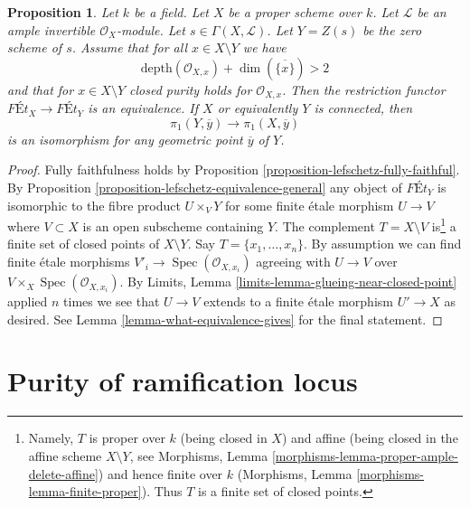 \documentclass{stacks-project}
\theoremstyle{plain}
\newtheorem{proposition}[subsection]{Proposition}
\theoremstyle{definition}
\theoremstyle{remark}
\numberwithin{equation}{subsection}
\def\Spec{\mathop{\mathrm{Spec}}}
\begin{document}
\begin{proposition}
\label{proposition-lefschetz-equivalence}
Let $k$ be a field. Let $X$ be a proper scheme over $k$.
Let $\mathcal{L}$ be an ample invertible $\mathcal{O}_X$-module.
Let $s \in \Gamma(X, \mathcal{L})$. Let $Y = Z(s)$ be the
zero scheme of $s$.
Assume that for all $x \in X \setminus Y$ we have
$$
\text{depth}(\mathcal{O}_{X, x}) + \dim(\overline{\{x\}}) > 2
$$
and that for $x \in X \setminus Y$ closed purity holds for
$\mathcal{O}_{X, x}$. Then the restriction functor
$\textit{F\'Et}_X \to \textit{F\'Et}_Y$
is an equivalence. If $X$ or equivalently $Y$ is connected, then
$$
\pi_1(Y, \overline{y}) \to \pi_1(X, \overline{y})
$$
is an isomorphism for any geometric point $\overline{y}$ of $Y$.
\end{proposition}

\begin{proof}
Fully faithfulness holds by
Proposition \ref{proposition-lefschetz-fully-faithful}.
By Proposition \ref{proposition-lefschetz-equivalence-general}
any object of $\textit{F\'Et}_Y$
is isomorphic to the fibre product $U \times_V Y$ for some
finite \'etale morphism $U \to V$ where $V \subset X$
is an open subscheme containing $Y$.
The complement $T = X \setminus V$
is\footnote{Namely, $T$ is proper over $k$ (being closed in $X$)
and affine (being closed in the affine scheme $X \setminus Y$, see
Morphisms, Lemma \ref{morphisms-lemma-proper-ample-delete-affine})
and hence finite over $k$
(Morphisms, Lemma \ref{morphisms-lemma-finite-proper}).
Thus $T$ is a finite set of closed points.}
a finite set of closed points of $X \setminus Y$.
Say $T = \{x_1, \ldots, x_n\}$.
By assumption we can find finite \'etale morphisms
$V'_i \to \Spec(\mathcal{O}_{X, x_i})$ agreeing with
$U \to V$ over $V \times_X \Spec(\mathcal{O}_{X, x_i})$.
By Limits, Lemma \ref{limits-lemma-glueing-near-closed-point}
applied $n$ times we see that $U \to V$ extends to a finite \'etale
morphism $U' \to X$ as desired.
See Lemma \ref{lemma-what-equivalence-gives} for the final statement.
\end{proof}










\section{Purity of ramification locus}
\label{section-purity-ramification}
\end{document}
